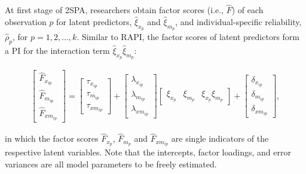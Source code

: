 \documentclass[
  man]{apa7}
\begin{document}
At first stage of 2SPA, researchers obtain factor scores (i.e., \(\widehat{F}\)) of each observation \(p\) for latent predictors, \(\widehat{\xi}_{x_{p}}\) and \(\widehat{\xi}_{m_{p}}\), and individual-specific reliability, \(\widehat{\rho}_{p}\), for \(p = 1, 2, ..., k\). Similar to RAPI, the factor scores of latent predictors form a PI for the interaction term \(\widehat{\xi}_{x_{p}}\widehat{\xi}_{m_{p}}\):

\begin{align}
    \begin{bmatrix}
        \widehat{F}_{x_{ip}} \\ 
        \widehat{F}_{m_{ip}} \\
        \widehat{F}_{xm_{ip}}
    \end{bmatrix} = 
    \begin{bmatrix}
        \tau_{x_{ip}} \\
        \tau_{m_{ip}} \\ 
        \tau_{xm_{ip}} 
    \end{bmatrix} + 
    \begin{bmatrix}
        \lambda_{x_{ip}} \\
        \lambda_{m_{ip}} \\ 
        \lambda_{xm_{ip}} 
    \end{bmatrix} 
    \begin{bmatrix}
        \xi_{x_{p}} & \xi_{m_{p}} & \xi_{x_{p}}\xi_{m_{p}}
    \end{bmatrix} +
    \begin{bmatrix}
        \delta_{x_{ip}} \\
        \delta_{m_{ip}} \\ 
        \delta_{xm_{ip}}
    \end{bmatrix},
\end{align}

in which the factor scores \(\widehat{F}_{x_{p}}\), \(\widehat{F}_{m_{p}}\) and \(\widehat{F}_{xm_{ip}}\) are single indicators of the respective latent variables. Note that the intercepts, factor loadings, and error variances are all model parameters to be freely estimated.
\end{document}
